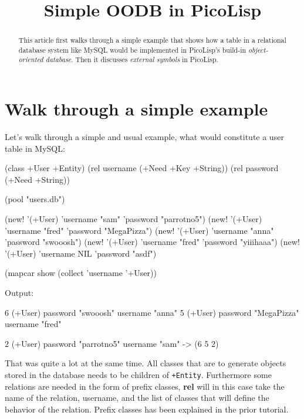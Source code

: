 \title{Simple OODB in PicoLisp}

\maketitle


\begin{abstract}
This article first walks through a simple example that shows how a
table in a relational database system like MySQL would be implemented
in PicoLisp's build-in \emph{object-oriented database}. Then it
discusses \emph{external symbols} in PicoLisp.     
\end{abstract}

\section{Walk through a simple  example}
\label{sec:simple-oodb-walk-through-a-simple-example}

Let's walk through a simple and usual example, what would constitute a
user table in MySQL:

\begin{wideverbatim}
(class +User +Entity)
(rel username (+Need +Key +String))
(rel password (+Need +String))

(pool "users.db")

(new! '(+User) 'username "sam" 'password "parrotno5")
(new! '(+User) 'username "fred" 'password "MegaPizza")
(new! '(+User) 'username "anna" 'password "swooosh")
(new! '(+User) 'username "fred" 'password "yiiihaaa")
(new! '(+User) 'username NIL 'password "asdf")

(mapcar show (collect 'username '+User))
\end{wideverbatim}

Output:

\begin{wideverbatim}
{6} (+User)
   password "swooosh"
   username "anna"
{5} (+User)
   password "MegaPizza"
   username "fred"

\end{wideverbatim}

\begin{wideverbatim}

{2} (+User)
   password "parrotno5"
   username "sam"
-> ({6} {5} {2})

\end{wideverbatim}

That was quite a lot at the same time. All classes that are to
generate objects stored in the database needs to be children of
\texttt{+Entity}. Furthermore some relations are needed in the form of
prefix classes, \textbf{rel} will in this case take the name of the
relation, username, and the list of classes that will define the
behavior of the relation. Prefix classes has been explained in the
prior tutorial.

